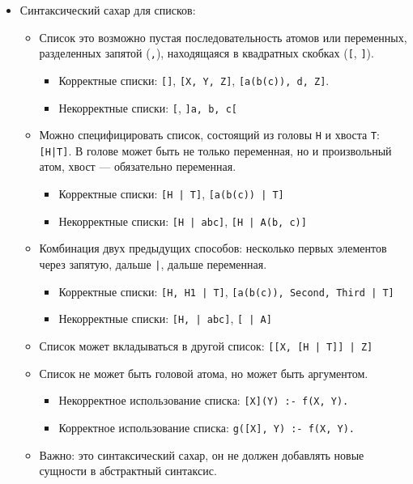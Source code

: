 \documentclass[12pt]{article}
\begin{document}
\begin{itemize}
\begin{itemize}
        \item Синтаксический сахар для списков:
        \begin{itemize}
          \item Список это возможно пустая последовательность атомов или переменных, разделенных запятой (\verb!,!), находящаяся в квадратных скобках (\verb![!, \verb!]!).
          \begin{itemize}
            \item Корректные списки: \verb![]!, \verb![X, Y, Z]!, \verb![a(b(c)), d, Z]!.
            \item Некорректные списки: \verb![!, \verb!]a, b, c[!
          \end{itemize}

          \item Можно специфицировать список, состоящий из головы \verb!H! и хвоста \verb!T!: \verb![H|T]!. В голове может быть не только переменная, но и произвольный атом, хвост --- обязательно переменная.
          \begin{itemize}
            \item Корректные списки: \verb![H | T]!, \verb![a(b(c)) | T]!
            \item Некорректные списки: \verb![H | abc]!, \verb![H | A(b, c)]!
          \end{itemize}
          \item Комбинация двух предыдущих способов: несколько первых элементов через запятую, дальше \verb!|!, дальше переменная.
          \begin{itemize}
            \item Корректные списки: \verb![H, H1 | T]!, \verb![a(b(c)), Second, Third | T]!
            \item Некорректные списки: \verb![H, | abc]!, \verb![ | A]!
          \end{itemize}
          \item Список может вкладываться в другой список: \verb![[X, [H | T]] | Z]!
          \item Список не может быть головой атома, но может быть аргументом.
          \begin{itemize}
            \item Некорректное использование списка: \verb![X](Y) :- f(X, Y).!
            \item Корректное использование списка: \verb!g([X], Y) :- f(X, Y).!
          \end{itemize}
          \item Важно: это синтаксический сахар, он не должен добавлять новые сущности в абстрактный синтаксис.

\end{itemize}
\end{itemize}
\end{itemize}
\end{document}
